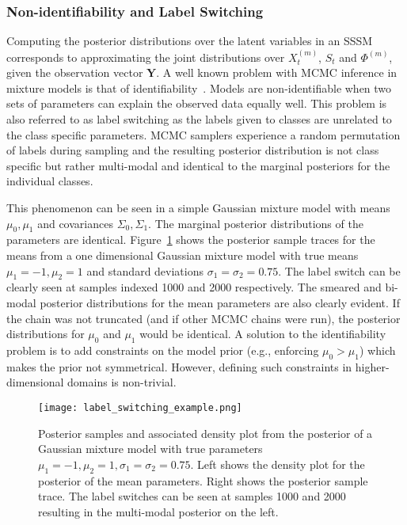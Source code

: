 \subsubsection{Non-identifiability and Label Switching}
Computing the posterior distributions over the latent variables in an SSSM corresponds to approximating the joint distributions over $X_t^{(m)}$, $S_t$ and $\Phi^{(m)}$, given the observation vector $\mathbf{Y}$. A well known problem with MCMC inference in mixture models is that of identifiability~\citep{jasra2005markov}. Models are non-identifiable when two sets of parameters can explain the observed data equally well. This problem is also referred to as label switching as the labels given to classes are unrelated to the class specific parameters. MCMC samplers experience a random permutation of labels during sampling and the resulting posterior distribution is not class specific but rather multi-modal and identical to the marginal posteriors for the individual classes.

This phenomenon can be seen in a simple Gaussian mixture model with means $\mu_0, \mu_1$ and covariances $\Sigma_0, \Sigma_1$. The marginal posterior distributions of the parameters are identical. Figure~\ref{fig:label_switching_example} shows the posterior sample traces for the means from a one dimensional Gaussian mixture model with true means $\mu_1=-1, \mu_2=1$ and standard deviations $\sigma_1=\sigma_2=0.75$. The label switch can be clearly seen at samples indexed 1000 and 2000 respectively. The smeared and bi-modal posterior distributions for the mean parameters are also clearly evident. If the chain was not truncated (and if other MCMC chains were run), the posterior distributions for $\mu_0$ and $\mu_1$ would be identical. A solution to the identifiability problem is to add constraints on the model prior (e.g., enforcing $\mu_0 > \mu_1$) which makes the prior not symmetrical. However, defining such constraints in higher-dimensional domains is non-trivial.

\begin{figure}
  \centering
  \texttt{[image: label\_switching\_example.png]}
  \caption{Posterior samples and associated density plot from the posterior of a Gaussian mixture model with true parameters $\mu_1 = -1, \mu_2=1, \sigma_1=\sigma_2=0.75$. Left shows the density plot for the posterior of the mean parameters. Right shows the posterior sample trace. The label switches can be seen at samples 1000 and 2000 resulting in the multi-modal posterior on the left.}
  \label{fig:label_switching_example}
\end{figure}

